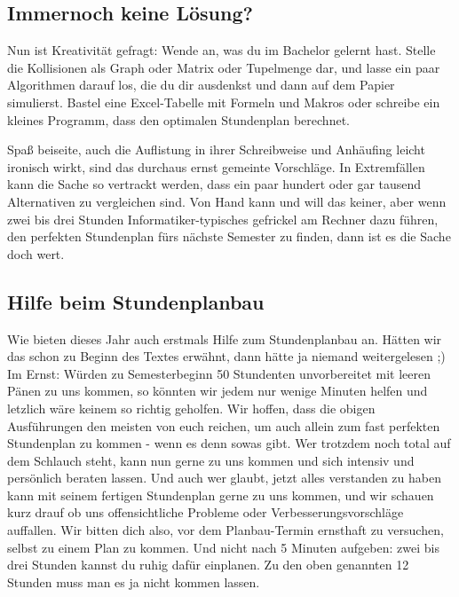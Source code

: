 \subsection{Immernoch keine Lösung?}
Nun ist Kreativität gefragt: Wende an, was du im Bachelor gelernt hast. Stelle die Kollisionen als Graph oder Matrix oder Tupelmenge dar, und lasse ein paar Algorithmen darauf los, die du dir ausdenkst und dann auf dem Papier simulierst. Bastel eine Excel-Tabelle mit Formeln und Makros oder schreibe ein kleines Programm, dass den optimalen Stundenplan berechnet. 

Spaß beiseite, auch die Auflistung in ihrer Schreibweise und Anhäufing leicht ironisch wirkt, sind das durchaus ernst gemeinte Vorschläge. In Extremfällen kann die Sache so vertrackt werden, dass ein paar hundert oder gar tausend Alternativen zu vergleichen sind. Von Hand kann und will das keiner, aber wenn zwei bis drei Stunden Informatiker-typisches gefrickel am Rechner dazu führen, den perfekten Stundenplan fürs nächste Semester zu finden, dann ist es die Sache doch wert.

\subsection{Hilfe beim Stundenplanbau}
Wie bieten dieses Jahr auch erstmals Hilfe zum Stundenplanbau an. Hätten wir das schon zu Beginn des Textes erwähnt, dann hätte ja niemand weitergelesen ;) Im Ernst: Würden zu Semesterbeginn 50 Stundenten unvorbereitet mit leeren Pänen zu uns kommen, so könnten wir jedem nur wenige Minuten helfen und letzlich wäre keinem so richtig geholfen. Wir hoffen, dass die obigen Ausführungen den meisten von euch reichen, um auch allein zum fast perfekten Stundenplan zu kommen - wenn es denn sowas gibt. Wer trotzdem noch total auf dem Schlauch steht, kann nun gerne zu uns kommen und sich intensiv und persönlich beraten lassen. Und auch wer glaubt, jetzt alles verstanden zu haben kann mit seinem fertigen Stundenplan gerne zu uns kommen, und wir schauen kurz drauf ob uns offensichtliche Probleme oder Verbesserungsvorschläge auffallen. Wir bitten dich also, vor dem Planbau-Termin ernsthaft zu versuchen, selbst zu einem Plan zu kommen. Und nicht nach 5 Minuten aufgeben: zwei bis drei Stunden kannst du ruhig dafür einplanen. Zu den oben genannten 12 Stunden muss man es ja nicht kommen lassen.

